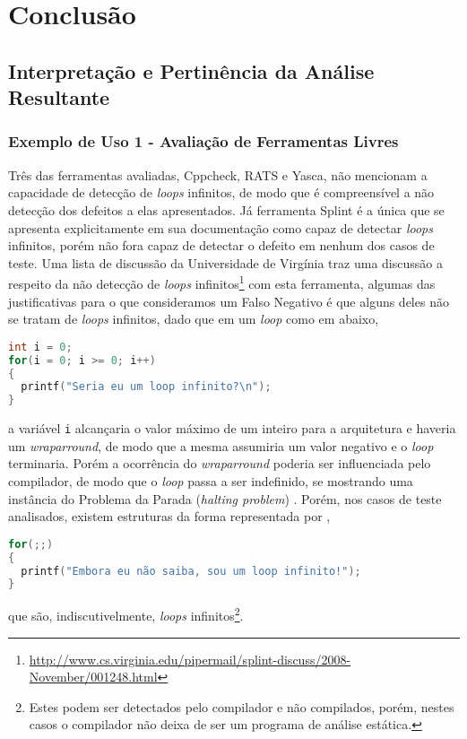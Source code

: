 \chapter*{Conclusão}\label{conclusoes}

\section*{Interpretação e Pertinência da Análise Resultante}

\subsection*{Exemplo de Uso 1 - Avaliação de Ferramentas Livres}

Três das ferramentas avaliadas, Cppcheck, RATS e Yasca, não mencionam a capacidade de detecção de \textit{loops} infinitos, de modo que é compreensível a não detecção dos defeitos a elas apresentados.  Já ferramenta Splint é a única que se apresenta explicitamente em sua documentação como capaz de detectar \textit{loops} infinitos, porém não fora capaz de detectar o defeito em nenhum dos casos de teste. Uma lista de discussão da Universidade de Virgínia traz uma discussão a respeito da não detecção de \textit{loops} infinitos\footnote{\url{http://www.cs.virginia.edu/pipermail/splint-discuss/2008-November/001248.html}} com esta ferramenta, algumas das justificativas para o que consideramos um Falso Negativo é que alguns deles não se tratam de \textit{loops} infinitos, dado que em um \textit{loop} como em  abaixo,
\begin{lstlisting}[breaklines=true, language=C,caption=Exemplo de loop indefinido,label=undefined_for]
int i = 0;
for(i = 0; i >= 0; i++)
{
  printf("Seria eu um loop infinito?\n");
}
\end{lstlisting}
a variável \lstinline{i} alcançaria o valor máximo de um inteiro para a arquitetura e haveria um \textit{wraparround}, de modo que a mesma assumiria um valor negativo e o \textit{loop} terminaria. Porém a ocorrência do \textit{wraparround} poderia ser influenciada pelo compilador, de modo que o \textit{loop} passa a ser indefinido, se mostrando uma instância do Problema da Parada (\textit{halting problem}) \cite{turing}. Porém, nos casos de teste analisados, existem estruturas da forma representada por ,
\begin{lstlisting}[breaklines=true, language=C, caption=Exemplo de loop infinito,label=infinite_for]
for(;;)
{
  printf("Embora eu não saiba, sou um loop infinito!");
}
\end{lstlisting}
que são, indiscutivelmente, \textit{loops} infinitos\footnote{Estes podem ser detectados pelo compilador e não compilados, porém, nestes casos o compilador não deixa de ser um programa de análise estática.}.

